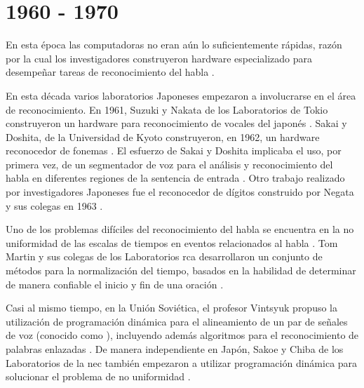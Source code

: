 \section{1960 - 1970}
\label{sec:60s}

En esta \'{e}poca las computadoras no eran a\'un lo suficientemente r\'{a}pidas, razón por la cual
los investigadores construyeron hardware especializado para desempe\~{n}ar tareas de reconocimiento 
del habla \cite{Furui50Years2004}.

En esta d\'{e}cada varios laboratorios Japoneses empezaron a involucrarse en el \'{a}rea de reconocimiento.
En 1961, Suzuki y Nakata de los Laboratorios  de Tokio 
construyeron un hardware para reconocimiento de vocales del japon\'{e}s \cite{SuzukiRecognition1961}. 
Sakai y Doshita, de la Universidad de Kyoto construyeron, en 1962, un hardware reconocedor de 
fonemas \cite{SakaiThePhonetic1962}. El esfuerzo de Sakai y Doshita implicaba el uso,
por primera vez, de un segmentador de voz para el an\'{a}lisis y reconocimiento
del habla en diferentes regiones de la sentencia de entrada \cite{JaisalAReview2012}.
Otro trabajo realizado por investigadores Japoneses fue el reconocedor de d\'{i}gitos construido por
Negata y sus colegas en 1963 \cite{NagataSpoken1963}.

Uno de los problemas dif\'{i}ciles del reconocimiento del habla se encuentra en la no uniformidad de las 
escalas de tiempos en eventos relacionados al habla \cite{Furui50Years2004}. Tom Martin y sus colegas de
los Laboratorios \gls{rca} desarrollaron un conjunto de m\'{e}todos para la normalizaci\'{o}n del tiempo, 
basados en la habilidad de determinar de manera confiable el inicio y fin de una oraci\'{o}n 
\cite{MartinSpeech1964}.

Casi al mismo tiempo, en la Uni\'{o}n Sovi\'{e}tica, el profesor Vintsyuk propuso la utilizaci\'{o}n de
programaci\'{o}n din\'{a}mica para el alineamiento de un par de se\~{n}ales de voz 
(conocido como ), incluyendo adem\'{a}s algoritmos para el reconocimiento 
de palabras enlazadas \cite{VintsyukSpeech1968}. De manera independiente en Jap\'{o}n, Sakoe y Chiba de
los Laboratorios de la \gls{nec} tambi\'{e}n empezaron a utilizar programaci\'{o}n din\'{a}mica para
solucionar el problema de no uniformidad \cite{SakoeDynamic1978}.